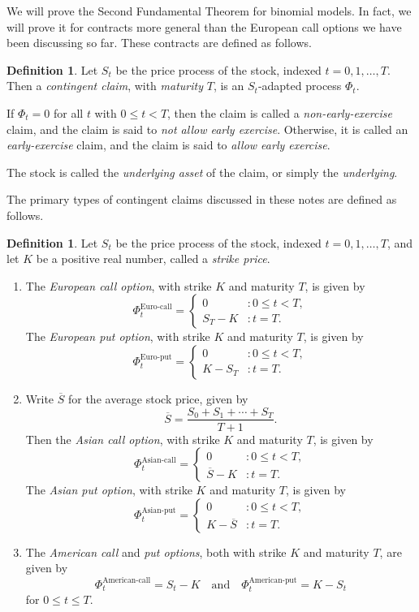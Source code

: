 \documentclass[11pt, openany, oneside]{book}
\theoremstyle{definition}
\newtheorem{defn}[thm]{Definition}
\theoremstyle{remark}
\theoremstyle{boldital}
\numberwithin{equation}{section}
\begin{document}
We will prove the Second Fundamental Theorem for binomial models. In fact, we will prove it for contracts more general than the European call options we have been discussing so far. These contracts are defined as follows.

\begin{defn}\label{defn:contingent-claim}
Let $S_t$ be the price process of the stock, indexed $t=0,1,\ldots,T$. Then a \textit{contingent claim}, with \textit{maturity} $T$, is an $S_t$-adapted process $\Phi_t$.

If $\Phi_t=0$ for all $t$ with $0 \leq t < T$, then the claim is called a \textit{non-early-exercise} claim, and the claim is said to \textit{not allow early exercise}. Otherwise, it is called an \textit{early-exercise} claim, and the claim is said to \textit{allow early exercise}.

The stock is called the \textit{underlying asset} of the claim, or simply the \textit{underlying}.
\end{defn}

The primary types of contingent claims discussed in these notes are defined as follows.

\begin{defn}\label{defn:options}
Let $S_t$ be the price process of the stock, indexed $t=0,1,\ldots,T$, and let $K$ be a positive real number, called a \textit{strike price}.
\begin{enumerate}
\item The \textit{European call option}, with strike $K$ and maturity $T$, is given by
	\[
	\Phi^\text{Euro-call}_t = \begin{cases} 0 & : 0 \leq t < T, \\ S_T-K &: t=T.\end{cases}
	\]
The \textit{European put option}, with strike $K$ and maturity $T$, is given by
	\[
	\Phi^\text{Euro-put}_t = \begin{cases} 0 & : 0 \leq t < T, \\ K-S_T &: t=T.\end{cases}
	\]
\item Write $\overline{S}$ for the average stock price, given by
	\[
	\overline{S} = \frac{S_0+S_1+\cdots + S_T}{T+1}.
	\]
Then the \textit{Asian call option}, with strike $K$ and maturity $T$, is given by
	\[
	\Phi^\text{Asian-call}_t = \begin{cases} 0 & : 0 \leq t < T, \\ \overline{S}-K &: t=T.\end{cases}
	\]
The \textit{Asian put option}, with strike $K$ and maturity $T$, is given by
	\[
	\Phi^\text{Asian-put}_t = \begin{cases} 0 & : 0 \leq t < T, \\  K-\overline{S} &: t=T.\end{cases}
	\]
\item The \textit{American call} and \textit{put options}, both with strike $K$ and maturity $T$, are given by
	\[
	\Phi^\text{American-call}_t = S_t-K \quad \text{and} \quad \Phi^\text{American-put}_t = K-S_t
	\]
for $0\leq t \leq T$.
\end{enumerate}
\end{defn}
\end{document}
